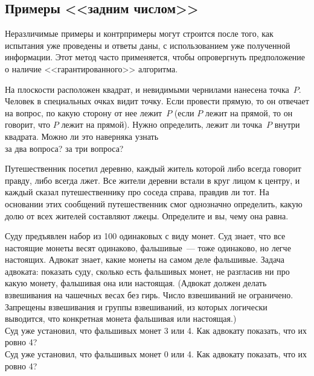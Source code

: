 \subsection*{Примеры <<задним числом>>}
Неразличимые примеры и контрпримеры могут строится после того, как испытания
уже проведены и ответы даны, с использованием уже полученной информации.
Этот метод часто применяется, чтобы опровергнуть предположение о наличие
<<гарантированного>> алгоритма.

\begin{problems}

\item
На плоскости расположен квадрат, и невидимыми чернилами нанесена точка~$P$.
Человек в специальных очках видит точку.
Если провести прямую, то он отвечает на вопрос, по какую сторону от нее
лежит~$P$ (если $P$ лежит на прямой, то он говорит, что $P$ лежит на прямой).
Нужно определить, лежит ли точка~$P$ внутри квадрата.
Можно ли это наверняка узнать
\\
\sp за два вопроса?
\qquad
\sp за три вопроса?

\item
Путешественник посетил деревню, каждый житель которой либо всегда говорит
правду, либо всегда лжет.
Все жители деревни встали в круг лицом к центру, и каждый сказал
путешественнику про соседа справа, правдив ли тот.
На основании этих сообщений путешественник смог однозначно определить, какую
долю от всех жителей составляют лжецы.
Определите и вы, чему она равна.

\item
Суду предъявлен набор из 100 одинаковых с виду монет.
Суд знает, что все настоящие монеты весят одинаково, фальшивые~--- тоже
одинаково, но легче настоящих.
Адвокат знает, какие монеты на самом деле фальшивые.
Задача адвоката: показать суду, сколько есть фальшивых монет, не разгласив
ни про какую монету, фальшивая она или настоящая.
(Адвокат должен делать взвешивания на чашечных весах без гирь.
Число взвешиваний не ограничено.
Запрещены взвешивания и группы взвешиваний, из которых логически выводится, что
конкретная монета фальшивая или настоящая.)
\\
\sp
Суд уже установил, что фальшивых монет 3 или 4.
Как адвокату показать, что их ровно 4?
\\
\sp
Суд уже установил, что фальшивых монет 0 или 4.
Как адвокату показать, что их ровно 4?

\end{problems}

